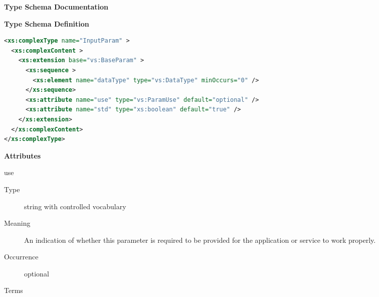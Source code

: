 \documentclass[11pt,a4paper]{ivoa}
\begin{document}
\begin{generated}
\begingroup
      	\renewcommand*\descriptionlabel[1]{%
      	\hbox to 5.5em{\emph{#1}\hfil}}\vspace{2ex}\noindent\textbf{ Type Schema Documentation}



\vspace{1ex}\noindent\textbf{ Type Schema Definition}

\begin{lstlisting}[language=XML,basicstyle=\footnotesize]
<xs:complexType name="InputParam" >
  <xs:complexContent >
    <xs:extension base="vs:BaseParam" >
      <xs:sequence >
        <xs:element name="dataType" type="vs:DataType" minOccurs="0" />
      </xs:sequence>
      <xs:attribute name="use" type="vs:ParamUse" default="optional" />
      <xs:attribute name="std" type="xs:boolean" default="true" />
    </xs:extension>
  </xs:complexContent>
</xs:complexType>
\end{lstlisting}

\vspace{0.5ex}\noindent\textbf{ Attributes}

\begingroup\small\begin{bigdescription}
\item[use]
\begin{description}
\item[Type] string with controlled vocabulary
\item[Meaning] 
                     An indication of whether this parameter is
                     required to be provided for the application
                     or service to work properly.  
                  
\item[Occurrence] optional

\item[Terms]\hfil
{}
\end{description}
\end{bigdescription}
\end{generated}
\end{document}
